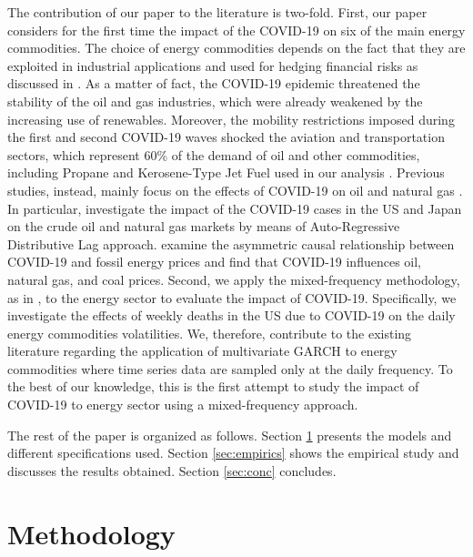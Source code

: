 {The contribution of our paper to the literature is two-fold. First, our paper considers for the first time the impact of the COVID-19 on} {six of the main} {energy commodities. The choice of energy commodities depends on the fact that they are exploited in industrial applications and used for hedging financial risks as discussed in \citep{abid2020hedging}. As a matter of fact, the COVID-19 epidemic threatened the stability of the oil and gas industries, which were already weakened by the increasing use of renewables. Moreover, the mobility restrictions imposed during the first and second COVID-19 waves \citep{sadowski2021big, nouvellet2021reduction, arenas2020modeling} shocked the aviation and transportation sectors, which represent 60\% of the demand of oil and other commodities, including Propane and Kerosene-Type Jet Fuel used in our analysis \citep{iea2020oil}. Previous studies, instead, mainly focus on  the effects of  COVID-19 on oil and natural gas \citep{narayan2020oil, gil2020crude, lin2021does, de2021price}. In particular, \cite{nyga2020energy} investigate the impact of the COVID-19 cases in the US and Japan on the crude oil and natural gas markets by means of Auto-Regressive Distributive Lag approach. \cite{wang2021asymmetric}  examine the asymmetric causal relationship between COVID-19 and fossil energy prices and find that COVID-19 influences oil, natural gas, and coal prices. %
Second, we apply the mixed-frequency methodology, as in \cite{candila2021multivariate}, to the energy sector to evaluate the impact of COVID-19. Specifically, we investigate the effects of weekly deaths in the US due to COVID-19 on the daily energy commodities volatilities. We, therefore, contribute to the existing literature regarding  the application of multivariate GARCH \citep{ku2007application, yousfi2021risk} to energy commodities \citep{chkili2014instabilities, silvennoinen2013financialization, chang2011crude} where time series data are sampled only at the daily frequency. To the best of our knowledge, this is the first attempt to study the impact of COVID-19 to energy sector using a mixed-frequency approach.}

The rest of the paper is organized as follows. Section \ref{sec:methodology} presents the models and different specifications used. Section \ref{sec:empirics} shows the empirical study and discusses the results obtained. Section \ref{sec:conc} concludes.

\section{Methodology}
\label{sec:methodology}
		
